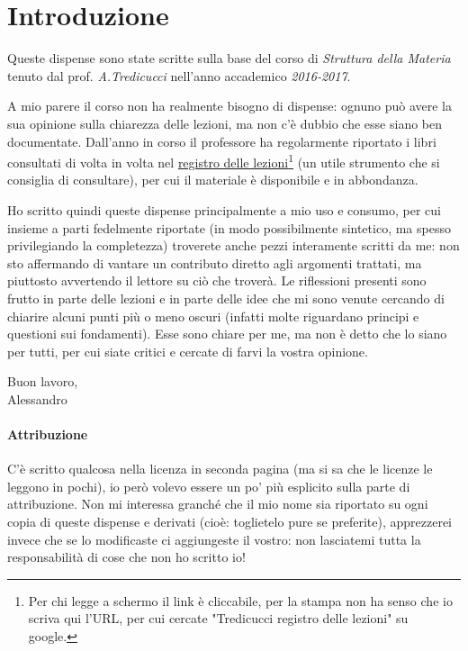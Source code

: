 \makeatletter\@openrightfalse\makeatother


\chapter*{Introduzione}

Queste dispense sono state scritte sulla base del corso di \textit{Struttura della Materia} tenuto dal prof. \textit{A.Tredicucci} nell'anno accademico \textit{2016-2017}.
\newline

A mio parere il corso non ha realmente bisogno di dispense: ognuno può avere la sua opinione sulla chiarezza delle lezioni, ma non c'è dubbio che esse siano ben documentate. Dall'anno in corso il professore ha regolarmente riportato i libri consultati di volta in volta nel \href{http://unimap.unipi.it/registri/dettregistriNEW.php?re=181626::::&ri=12126}{registro delle lezioni}\footnote{Per chi legge a schermo il link è cliccabile, per la stampa non ha senso che io scriva qui l'URL, per cui cercate "Tredicucci registro delle lezioni" su google.} (un utile strumento che si consiglia di consultare), per cui il materiale è disponibile e in abbondanza.
\newline

Ho scritto quindi queste dispense principalmente a mio uso e consumo, per cui insieme a parti fedelmente riportate (in modo possibilmente sintetico, ma spesso privilegiando la completezza) troverete anche pezzi interamente scritti da me: non sto affermando di vantare un contributo diretto agli argomenti trattati, ma piuttosto avvertendo il lettore su ciò che troverà. Le riflessioni presenti sono frutto in parte delle lezioni e in parte delle idee che mi sono venute cercando di chiarire alcuni punti più o meno oscuri (infatti molte riguardano principi e questioni sui fondamenti). Esse sono chiare per me, ma non è detto che lo siano per tutti, per cui siate critici e cercate di farvi la vostra opinione.

\begin{flushright}
	Buon lavoro,\\
	Alessandro
\end{flushright}

\subsubsection*{Attribuzione}
C'è scritto qualcosa nella licenza in seconda pagina (ma si sa che le licenze le leggono in pochi), io però volevo essere un po' più esplicito sulla parte di attribuzione. Non mi interessa granché che il mio nome sia riportato su ogni copia di queste dispense e derivati (cioè: toglietelo pure se preferite), apprezzerei invece che se lo modificaste ci aggiungeste il vostro: non lasciatemi tutta la responsabilità di cose che non ho scritto io!

\makeatletter\@openrighttrue\makeatother